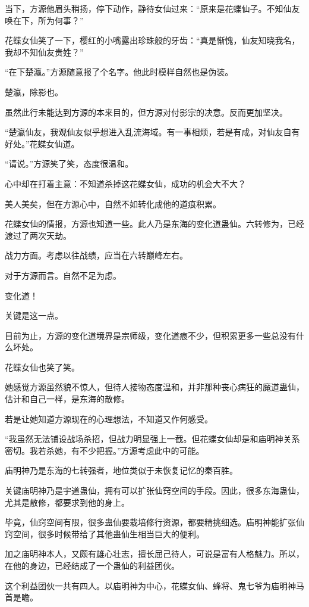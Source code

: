 \begin{this_body}
当下，方源他眉头稍扬，停下动作，静待女仙过来：“原来是花蝶仙子。不知仙友唤在下，所为何事？”

花蝶女仙笑了一下，樱红的小嘴露出珍珠般的牙齿：“真是惭愧，仙友知晓我名，我却不知仙友贵姓？”

“在下楚瀛。”方源随意报了个名字。他此时模样自然也是伪装。

楚瀛，除影也。

虽然此行未能达到方源的本来目的，但方源对付影宗的决意。反而更加坚决。

“楚瀛仙友，我观仙友似乎想进入乱流海域。有一事相烦，若是有成，对仙友自有好处。”花蝶女仙道。

“请说。”方源笑了笑，态度很温和。

心中却在打着主意：不知道杀掉这花蝶女仙，成功的机会大不大？

美人美矣，但在方源心中，自然不如转化成他的道痕积累。

花蝶女仙的情报，方源也知道一些。此人乃是东海的变化道蛊仙。六转修为，已经渡过了两次天劫。

战力方面。考虑以往战绩，应当在六转巅峰左右。

对于方源而言。自然不足为虑。

变化道！

关键是这一点。

目前为止，方源的变化道境界是宗师级，变化道痕不少，但积累更多一些总没有什么坏处。

花蝶女仙也笑了笑。

她感觉方源虽然貌不惊人，但待人接物态度温和，并非那种丧心病狂的魔道蛊仙，估计和自己一样，是东海的散修。

若是让她知道方源现在的心理想法，不知道又作何感受。

“我虽然无法铺设战场杀招，但战力明显强上一截。但花蝶女仙却是和庙明神关系密切。我若杀她，有不少把握。”方源考虑此中的可能。

庙明神乃是东海的七转强者，地位类似于未恢复记忆的秦百胜。

关键庙明神乃是宇道蛊仙，拥有可以扩张仙窍空间的手段。因此，很多东海蛊仙，尤其是散修，都要求到他的身上。

毕竟，仙窍空间有限，很多蛊仙要栽培修行资源，都要精挑细选。庙明神能扩张仙窍空间，很多时候带给了其他蛊仙生相当巨大的便利。

加之庙明神本人，又颇有雄心壮志，擅长屈己待人，可说是富有人格魅力。所以，在他的身边，已经结成了一个蛊仙的利益团伙。

这个利益团伙一共有四人。以庙明神为中心，花蝶女仙、蜂将、鬼七爷为庙明神马首是瞻。


\end{this_body}
